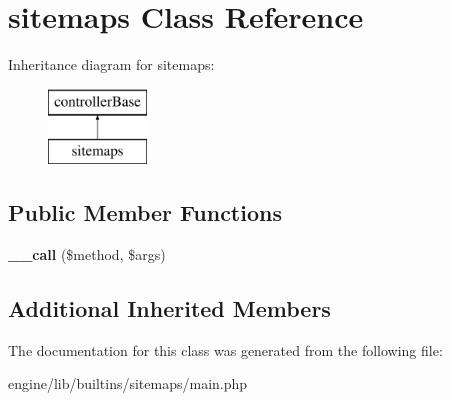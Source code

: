 \hypertarget{classsitemaps}{\section{sitemaps Class Reference}
\label{classsitemaps}
}
Inheritance diagram for sitemaps\-:\begin{figure}[H]
\begin{center}
\leavevmode
\includegraphics[height=2.000000cm]{classsitemaps}
\end{center}
\end{figure}
\subsection*{Public Member Functions}
\begin{DoxyCompactItemize}
\item 
\hypertarget{classsitemaps_a8b19067e6e0027d49a8d7ddfedec5cbd}{{\bfseries \-\_\-\-\_\-call} (\$method, \$args)}\label{classsitemaps_a8b19067e6e0027d49a8d7ddfedec5cbd}

\end{DoxyCompactItemize}
\subsection*{Additional Inherited Members}


The documentation for this class was generated from the following file\-:\begin{DoxyCompactItemize}
\item 
engine/lib/builtins/sitemaps/main.\-php\end{DoxyCompactItemize}
